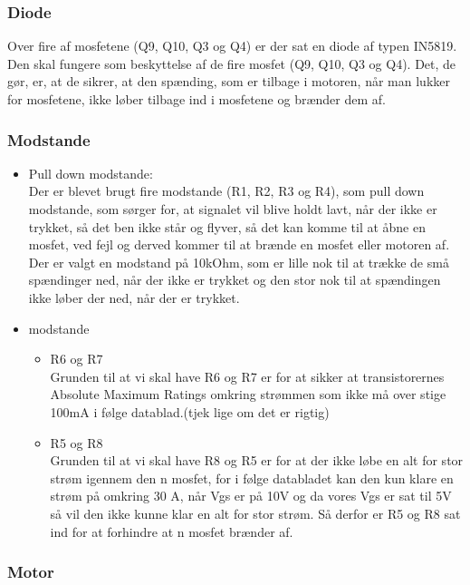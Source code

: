 \subsubsection{Diode}
Over fire af mosfetene (Q9, Q10, Q3 og Q4) er der sat en diode af typen IN5819. Den skal fungere som beskyttelse af de fire mosfet (Q9, Q10, Q3 og Q4). Det, de gør, er, at de sikrer, at den spænding, som er tilbage i motoren, når man lukker for mosfetene, ikke løber tilbage ind i mosfetene og brænder dem af.

\subsubsection{Modstande}
\begin{itemize}
	\item Pull down modstande:\\
	Der er blevet brugt fire modstande (R1, R2, R3 og R4), som pull down modstande, som sørger for, at signalet vil blive holdt lavt, når der ikke er trykket, så det ben ikke står og flyver, så det kan komme til at åbne en mosfet, ved fejl og derved kommer til at brænde en mosfet eller motoren af. Der er valgt en modstand på 10kOhm, som er lille nok til at trække de små spændinger ned, når der ikke er trykket og den stor nok til at spændingen ikke løber der ned, når der er trykket.
	\item modstande
	\begin{itemize}
		\item R6 og R7\\
			Grunden til at vi skal have R6 og R7 er for at sikker at transistorernes Absolute Maximum Ratings omkring strømmen som ikke må over stige 100mA i følge datablad.(tjek lige om det er rigtig)
		\item R5 og R8\\
		Grunden til at vi skal have R8 og R5 er for at der ikke løbe en alt for stor strøm igennem  den n mosfet, for i følge databladet kan den kun klare en strøm på omkring 30 A, når Vgs er på 10V og da vores Vgs er sat til 5V så vil den ikke kunne klar en alt for stor strøm. Så derfor er R5 og R8 sat ind for at forhindre at n mosfet brænder af.
	\end{itemize}
	
	
\end{itemize}
\subsubsection{Motor}
